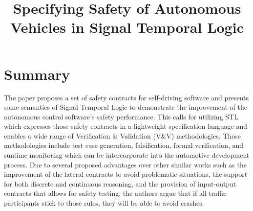 \documentclass[10pt,a4paper]{report}
\title{Specifying Safety of Autonomous Vehicles in Signal Temporal Logic}
\begin{document}
\begin{center}
\textbf{\thetitle}
\end{center}


\section{Summary}
The paper proposes a set of safety contracts for self-driving software and presents some semantics of Signal Temporal Logic to demonstrate the improvement of the autonomous control software's safety performance.
%
This calls for utilizing STL which expresses those safety contracts in a lightweight specification language and enables a wide range of Verification \& Validation (V\&V) methodologies.
%
Those methodologies include test case generation, falsification, formal verification, and runtime monitoring which can be intercorporate into the automotive development process.
%
Due to several proposed advantages over other similar works such as the improvement of the lateral contracts to avoid problematic situations, the support for both discrete and continuous reasoning, and the provision of input-output contracts that allows for safety testing, the authors argue that if all traffic participants stick to those rules, they will be able to avoid crashes.
%
\end{document}
